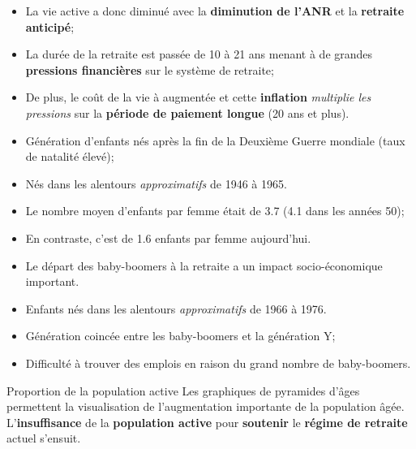 \documentclass[10pt, french]{article}
\begin{document}
\begin{multicols*}{3}
\begin{rappel_enhanced}
\begin{itemize}[leftmargin = *]
		\item	La vie active a donc diminué avec la \textbf{diminution de l'ANR} et la \textbf{retraite anticipé};
		\item	La durée de la retraite est passée de 10 à 21 ans menant à de grandes \textbf{pressions financières} sur le système de retraite;
		\item	De plus, le coût de la vie à augmentée et cette \textbf{inflation} \textit{multiplie les pressions} sur la \textbf{période de paiement longue} (20 ans et plus).
\end{itemize}
\end{rappel_enhanced}


\begin{rappel_enhanced}
\begin{itemize}[leftmargin = *]
	\item	Génération d'enfants nés après la fin de la Deuxième Guerre mondiale (taux de natalité élevé);
	\item[]	Nés dans les alentours \textit{approximatifs} de 1946 à 1965.
	\item	Le nombre moyen d'enfants par femme était de 3.7 (4.1 dans les années 50);
	\item[]	En contraste, c'est de 1.6 enfants par femme aujourd'hui.
	\item	Le départ des baby-boomers à la retraite a un impact socio-économique important.
\end{itemize}
\end{rappel_enhanced}

\begin{rappel_enhanced}
\begin{itemize}[leftmargin = *]
	\item	Enfants nés dans les alentours \textit{approximatifs} de 1966 à 1976.
	\item	Génération coincée entre les baby-boomers et la génération Y;
	\item	Difficulté à trouver des emplois en raison du grand nombre de baby-boomers.
\end{itemize}
\end{rappel_enhanced}

\begin{conceptgen}{Proportion de la population active}
Les graphiques de pyramides d'âges permettent la visualisation de l'augmentation importante de la population âgée. L'\textbf{insuffisance} de la \textbf{population active} pour \textbf{soutenir} le \textbf{régime de retraite} actuel s'ensuit.


\end{conceptgen}
\end{multicols*}
\end{document}

